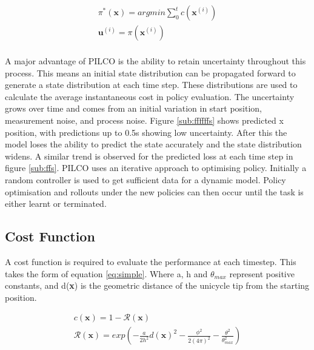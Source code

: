 \documentclass[twoside,twocolumn,12pt]{article}
\begin{document}
\begin{equation}
\begin{split}
\pi^*(\textbf{x}) = argmin \sum_0^tc(\textbf{x}^{(i)}) \\
\textbf{u}^{(i)} = \pi(\textbf{x}^{(i)} )\\
\end{split}
\label{eq:pilco}
\end{equation}




A major advantage of PILCO is the ability to retain uncertainty throughout this process. This means an initial state distribution can be propagated forward to generate a state distribution at each time step. These distributions are used to calculate the average instantaneous cost in policy evaluation.
The uncertainty grows over time and comes from an initial variation in start position, measurement noise, and process noise. 
\newline
Figure \ref{sub:ffffffs} shows predicted x position, with predictions up to 0.5s showing low uncertainty. After this the model loses the ability to predict the state accurately and the state distribution widens. 
A similar trend is observed for the predicted loss at each time step in figure \ref{sub:ffs}.
\newline
PILCO uses an iterative approach to optimising policy. Initially a random controller is used to get sufficient data for a dynamic model. Policy optimisation and rollouts under the new policies can then occur until the task is either learnt or terminated. 


\subsection{Cost Function}
A cost function is required to evaluate the performance at each timestep. This takes the form of equation \ref{eq:simple}. Where a, h and $\theta_{max}$ represent positive constants, and d(\textbf{x}) is the geometric distance of the unicycle tip from the starting position.


\begin{equation}
\label{eq:simple}
\begin{gathered}
c(\textbf{x}) = 1 - \mathcal{R}(\textbf{x}) \\ 
\mathcal{R}(\textbf{x}) = exp(-\frac{a}{2h^2}d(\textbf{x})^2 - \frac{\phi^2}{2(4\pi)^2} - \frac{\theta^2}{\theta_{max}^2}) 
\end{gathered} 
\end{equation}
\end{document}
